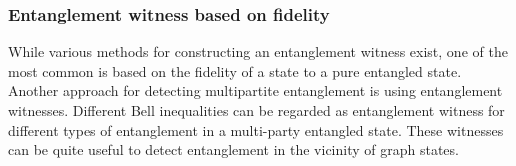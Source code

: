 \documentclass[
reprint,
aps,
pra,
floatfix,
]{revtex4-2}
\theoremstyle{plain}
\theoremstyle{definition}
\newtheorem{remark}{Remark}
\newcommand{\dm}{\rho}
\begin{document}


\subsubsection{Entanglement witness based on fidelity}\label{sec:entanglement_witness}
While various methods for constructing an entanglement witness exist, one of the most common is based on the ﬁdelity of a state to a pure entangled state.
Another approach for detecting multipartite entanglement is using entanglement witnesses.
Different Bell inequalities can be regarded as entanglement witness for different types of entanglement in a multi-party entangled state.
These witnesses can be quite useful to detect entanglement in the vicinity of graph states.

\end{document}

